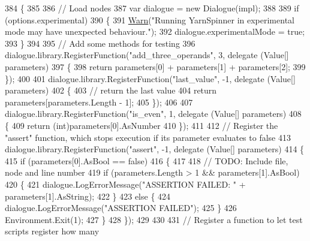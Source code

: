 \begin{DoxyCode}
384         \{
385 
386             \textcolor{comment}{// Load nodes}
387             var dialogue = \textcolor{keyword}{new} Dialogue(impl);
388 
389             \textcolor{keywordflow}{if} (options.experimental)
390             \{
391                 \hyperlink{a00189_a979bb6f049b6c5294f745a19e24ddd9d}{Warn}(\textcolor{stringliteral}{"Running YarnSpinner in experimental mode may have unexpected behaviour."});
392                 dialogue.experimentalMode = \textcolor{keyword}{true};
393             \}
394 
395             \textcolor{comment}{// Add some methods for testing}
396             dialogue.library.RegisterFunction(\textcolor{stringliteral}{"add\_three\_operands"}, 3, delegate (Value[] parameters)
397             \{
398                 \textcolor{keywordflow}{return} parameters[0] + parameters[1] + parameters[2];
399             \});
400 
401             dialogue.library.RegisterFunction(\textcolor{stringliteral}{"last\_value"}, -1, delegate (Value[] parameters)
402             \{
403                 \textcolor{comment}{// return the last value}
404                 \textcolor{keywordflow}{return} parameters[parameters.Length - 1];
405             \});
406 
407             dialogue.library.RegisterFunction(\textcolor{stringliteral}{"is\_even"}, 1, delegate (Value[] parameters)
408             \{
409                 \textcolor{keywordflow}{return} (\textcolor{keywordtype}{int})parameters[0].AsNumber %
410             \});
411 
412             \textcolor{comment}{// Register the "assert" function, which stops execution if its parameter evaluates to false}
413             dialogue.library.RegisterFunction(\textcolor{stringliteral}{"assert"}, -1, delegate (Value[] parameters)
414             \{
415                 \textcolor{keywordflow}{if} (parameters[0].AsBool == \textcolor{keyword}{false})
416                 \{
417 
418                     \textcolor{comment}{// TODO: Include file, node and line number}
419                     \textcolor{keywordflow}{if} (parameters.Length > 1 && parameters[1].AsBool)
420                     \{
421                         dialogue.LogErrorMessage(\textcolor{stringliteral}{"ASSERTION FAILED: "} + parameters[1].AsString);
422                     \}
423                     \textcolor{keywordflow}{else} \{
424                         dialogue.LogErrorMessage(\textcolor{stringliteral}{"ASSERTION FAILED"});
425                     \}
426                     Environment.Exit(1);
427                 \}
428             \});
429 
430 
431             \textcolor{comment}{// Register a function to let test scripts register how many}

\end{DoxyCode}
